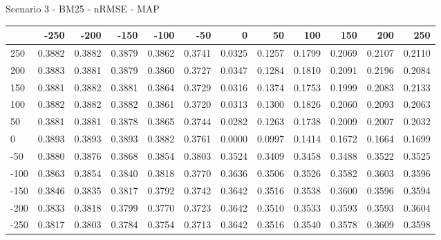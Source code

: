 Scenario 3 - BM25 - nRMSE - MAP
\begin{tabular}{lrrrrrrrrrrr}
\toprule
{} &   -250 &   -200 &   -150 &   -100 &   -50  &    0   &    50  &    100 &    150 &    200 &    250 \\
\midrule
 250 & 0.3882 & 0.3882 & 0.3879 & 0.3862 & 0.3741 & 0.0325 & 0.1257 & 0.1799 & 0.2069 & 0.2107 & 0.2110 \\
 200 & 0.3883 & 0.3881 & 0.3879 & 0.3860 & 0.3727 & 0.0347 & 0.1284 & 0.1810 & 0.2091 & 0.2196 & 0.2084 \\
 150 & 0.3881 & 0.3882 & 0.3881 & 0.3864 & 0.3729 & 0.0316 & 0.1374 & 0.1753 & 0.1999 & 0.2083 & 0.2133 \\
 100 & 0.3882 & 0.3882 & 0.3882 & 0.3861 & 0.3720 & 0.0313 & 0.1300 & 0.1826 & 0.2060 & 0.2093 & 0.2063 \\
 50  & 0.3881 & 0.3881 & 0.3878 & 0.3865 & 0.3744 & 0.0282 & 0.1263 & 0.1738 & 0.2009 & 0.2007 & 0.2032 \\
 0   & 0.3893 & 0.3893 & 0.3893 & 0.3882 & 0.3761 & 0.0000 & 0.0997 & 0.1414 & 0.1672 & 0.1664 & 0.1699 \\
-50  & 0.3880 & 0.3876 & 0.3868 & 0.3854 & 0.3803 & 0.3524 & 0.3409 & 0.3458 & 0.3488 & 0.3522 & 0.3525 \\
-100 & 0.3863 & 0.3854 & 0.3840 & 0.3818 & 0.3770 & 0.3636 & 0.3506 & 0.3526 & 0.3582 & 0.3603 & 0.3596 \\
-150 & 0.3846 & 0.3835 & 0.3817 & 0.3792 & 0.3742 & 0.3642 & 0.3516 & 0.3538 & 0.3600 & 0.3596 & 0.3594 \\
-200 & 0.3833 & 0.3818 & 0.3799 & 0.3770 & 0.3723 & 0.3642 & 0.3510 & 0.3533 & 0.3593 & 0.3593 & 0.3604 \\
-250 & 0.3817 & 0.3803 & 0.3784 & 0.3754 & 0.3713 & 0.3642 & 0.3516 & 0.3540 & 0.3578 & 0.3609 & 0.3598 \\
\bottomrule
\end{tabular}

